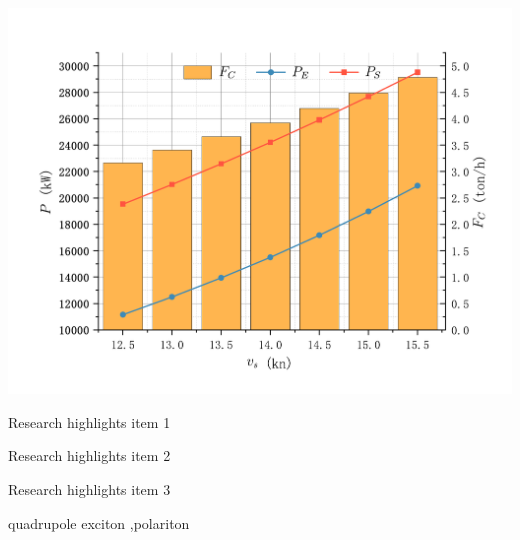 \documentclass[a4paper,fleqn]{cas-dc}
\begin{document}
\begin{abstract}
This template helps you to create a properly formatted \LaTeX\ manuscript.

\noindent\texttt{\textbackslash begin{abstract}} \dots 
\texttt{\textbackslash end{abstract}} and
\verb+\begin{keyword}+ \verb+...+ \verb+\end{keyword}+ 
which
contain the abstract and keywords respectively. 

\noindent Each keyword shall be separated by a \verb+\sep+ command.
\end{abstract}

\begin{graphicalabstract}
  \centering
    \includegraphics[scale=.5]{ppe_grab.pdf}
\end{graphicalabstract}

\begin{highlights}
\item Research highlights item 1
\item Research highlights item 2
\item Research highlights item 3
\end{highlights}

\begin{keywords}
quadrupole exciton \sep polariton
\end{keywords}


\maketitle
\end{document}

